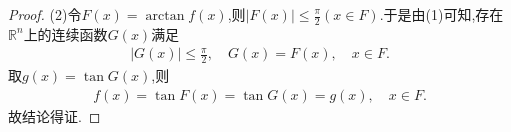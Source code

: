 \documentclass[../../main.tex]{subfiles}%
\begin{document}
\begin{proof}
(2)令\(F(x)=\arctan f(x)\),则$|F(x)|\leqslant \frac{\pi}{2}(x\in F)$.于是由(1)可知,存在$\mathbb{R}^n$上的连续函数$G(x)$满足
\begin{align*}
|G(x)|\leqslant \frac{\pi}{2},\quad G(x)=F(x),\quad x\in F.
\end{align*}
取$g(x)=\tan G(x)$,则
\begin{align*}
f(x)=\tan F(x)=\tan G(x)=g(x),\quad x\in F.
\end{align*}
故结论得证.
\end{proof}
\end{document}
